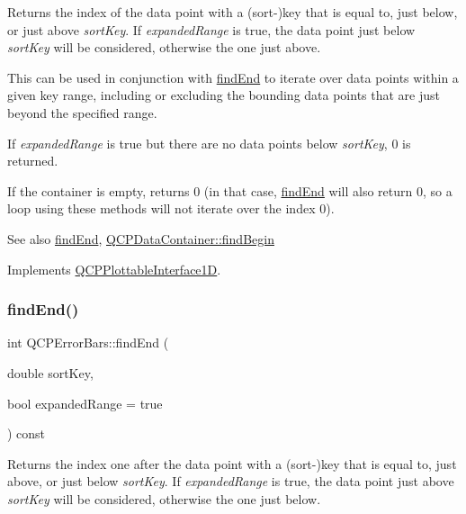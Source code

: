 Returns the index of the data point with a (sort-\/)key that is equal to, just below, or just above {\itshape sort\+Key}. If {\itshape expanded\+Range} is true, the data point just below {\itshape sort\+Key} will be considered, otherwise the one just above.

This can be used in conjunction with \hyperlink{classQCPErrorBars_ad22dd8499c6d45176ad0651751a0b0b0}{find\+End} to iterate over data points within a given key range, including or excluding the bounding data points that are just beyond the specified range.

If {\itshape expanded\+Range} is true but there are no data points below {\itshape sort\+Key}, 0 is returned.

If the container is empty, returns 0 (in that case, \hyperlink{classQCPErrorBars_ad22dd8499c6d45176ad0651751a0b0b0}{find\+End} will also return 0, so a loop using these methods will not iterate over the index 0).

\begin{DoxySeeAlso}{See also}
\hyperlink{classQCPErrorBars_ad22dd8499c6d45176ad0651751a0b0b0}{find\+End}, \hyperlink{classQCPDataContainer_a2ad8a5399072d99a242d3a6d2d7e278a}{Q\+C\+P\+Data\+Container\+::find\+Begin} 
\end{DoxySeeAlso}


Implements \hyperlink{classQCPPlottableInterface1D_a5b95783271306a4de97be54eac1e7d13}{Q\+C\+P\+Plottable\+Interface1D}.

\mbox{\label{classQCPErrorBars_ad22dd8499c6d45176ad0651751a0b0b0}} 
\subsubsection{\texorpdfstring{find\+End()}{findEnd()}}
{\footnotesize\ttfamily int Q\+C\+P\+Error\+Bars\+::find\+End (\begin{DoxyParamCaption}\item[{double}]{sort\+Key,  }\item[{bool}]{expanded\+Range = {\ttfamily true} }\end{DoxyParamCaption}) const\hspace{0.3cm}{\ttfamily [virtual]}}

Returns the index one after the data point with a (sort-\/)key that is equal to, just above, or just below {\itshape sort\+Key}. If {\itshape expanded\+Range} is true, the data point just above {\itshape sort\+Key} will be considered, otherwise the one just below.

